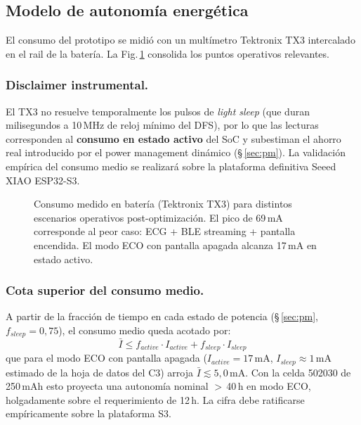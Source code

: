 \documentclass[letterpaper,11pt]{article}
\newcommand{\rfigura}[1]{Fig.\,\ref{#1}}
\begin{document}
\subsection{Modelo de autonomía energética}
\label{sec:autonomia}
El consumo del prototipo se midió con un multímetro Tektronix TX3 intercalado en el rail de la
batería. La \rfigura{fig:consumos} consolida los puntos operativos relevantes.

\subsubsection{Disclaimer instrumental.} El TX3 no resuelve temporalmente los pulsos de
\textit{light sleep} (que duran milisegundos a 10\,MHz de reloj mínimo del DFS), por lo que
las lecturas corresponden al \textbf{consumo en estado activo} del SoC y subestiman el ahorro
real introducido por el power management dinámico (§\,\ref{sec:pm}). La validación empírica
del consumo medio se realizará sobre la plataforma definitiva Seeed XIAO ESP32-S3.

\begin{figure}[H]
\centering
{}
\caption{Consumo medido en batería (Tektronix TX3) para distintos escenarios operativos
post-optimización. El pico de 69\,mA corresponde al peor caso: ECG + BLE streaming + pantalla
encendida. El modo ECO con pantalla apagada alcanza 17\,mA en estado activo.}
\label{fig:consumos}
\end{figure}

\subsubsection{Cota superior del consumo medio.} A partir de la fracción de tiempo en cada
estado de potencia (§\,\ref{sec:pm}, $f_{sleep}=0{,}75$), el consumo medio queda acotado por:
\begin{equation}
    \bar{I} \leq f_{active}\cdot I_{active} + f_{sleep}\cdot I_{sleep}
    \label{eq:autonomia}
\end{equation}
que para el modo ECO con pantalla apagada ($I_{active}=17$\,mA, $I_{sleep}\approx 1$\,mA
estimado de la hoja de datos del C3) arroja $\bar{I} \lesssim 5{,}0$\,mA. Con la celda 502030
de 250\,mAh esto proyecta una autonomía nominal $>$\,40\,h en modo ECO, holgadamente sobre
el requerimiento de 12\,h. La cifra debe ratificarse empíricamente sobre la plataforma S3.
\end{document}

